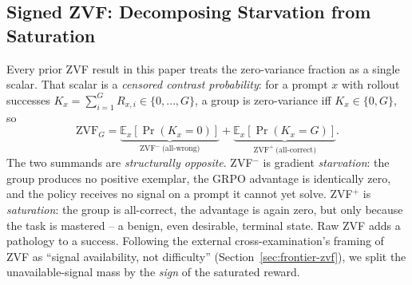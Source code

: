 
\subsection{Signed ZVF: Decomposing Starvation from Saturation}
\label{sec:zvf-signed}
Every prior ZVF result in this paper treats the zero-variance fraction as a
single scalar. That scalar is a
\emph{censored contrast probability}: for a prompt $x$ with rollout
successes $K_x{=}\sum_{i=1}^{G} R_{x,i} \in \{0,\dots,G\}$, a group is
zero-variance iff $K_x{\in}\{0,G\}$, so
\begin{equation}
\mathrm{ZVF}_G = \underbrace{\mathbb{E}_x\!\left[\Pr(K_x{=}0)\right]}_{\text{ZVF}^-\ \text{(all-wrong)}}
             + \underbrace{\mathbb{E}_x\!\left[\Pr(K_x{=}G)\right]}_{\text{ZVF}^+\ \text{(all-correct)}}.
\end{equation}
The two summands are \emph{structurally opposite}. ZVF$^-$ is
gradient \emph{starvation}: the group produces no positive exemplar, the
GRPO advantage is identically zero, and the policy receives no signal on
a prompt it cannot yet solve. ZVF$^+$ is \emph{saturation}: the group is
all-correct, the advantage is again zero, but only because the task is
mastered -- a benign, even desirable, terminal state. Raw ZVF adds a
pathology to a success. Following the external cross-examination's framing of
ZVF as ``signal availability, not difficulty'' (Section~\ref{sec:frontier-zvf}), we split
the unavailable-signal mass by the \emph{sign} of the saturated reward.


